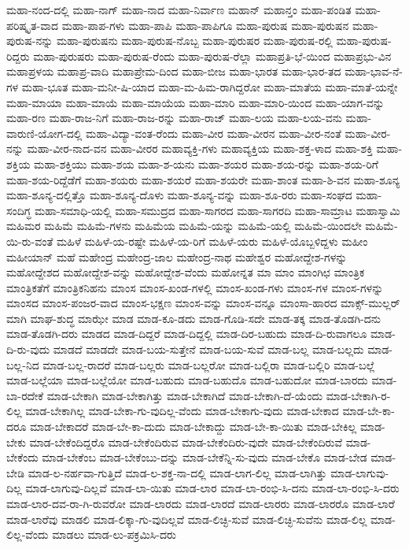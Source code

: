 {ಮಹಾ-ನಂದ-ದಲ್ಲಿ
ಮಹಾ-ನಾಗ್
ಮಹಾ-ನಾದ
ಮಹಾ-ನಿರ್ವಾಣ
ಮಹಾನ್
ಮಹಾನ್ತಂ
ಮಹಾ-ಪಂಡಿತ
ಮಹಾ-ಪರಿಷ್ಕೃತ-ವಾದ
ಮಹಾ-ಪಾಪ-ಗಳು
ಮಹಾ-ಪಾಪಿ
ಮಹಾ-ಪಾಪಿಗೂ
ಮಹಾ-ಪುರುಷ
ಮಹಾ-ಪುರುಷನ
ಮಹಾ-ಪುರುಷ-ನನ್ನು
ಮಹಾ-ಪುರುಷನು
ಮಹಾ-ಪುರುಷ-ನೊಬ್ಬ
ಮಹಾ-ಪುರುಷರ
ಮಹಾ-ಪುರುಷ-ರಲ್ಲಿ
ಮಹಾ-ಪುರುಷ-ರಿದ್ದರು
ಮಹಾ-ಪುರುಷರು
ಮಹಾ-ಪುರುಷ-ರೆಂದು
ಮಹಾ-ಪುರುಷ-ರೆಲ್ಲಾ
ಮಹಾಪ್ರತಿ-ಭೆ-ಯಿಂದ
ಮಹಾಪ್ರಭು-ವಿನ
ಮಹಾಪ್ರಳಯ
ಮಹಾಪ್ರ-ವಾದಿ
ಮಹಾಪ್ರೇಮ-ದಿಂದ
ಮಹಾ-ಬೀಜ
ಮಹಾ-ಭಾರತ
ಮಹಾ-ಭಾರ-ತದ
ಮಹಾ-ಭಾವ-ನೆ-ಗಳ
ಮಹಾ-ಭೂತ
ಮಹಾ-ಮನೀ-ಷಿ-ಯಾದ
ಮಹಾ-ಮ-ಹಿಮ-ರಾಗಿದ್ದರೋ
ಮಹಾ-ಮಾತೆಯ
ಮಹಾ-ಮಾತೆ-ಯನ್ನೇ
ಮಹಾ-ಮಾಯಾ
ಮಹಾ-ಮಾಯೆ
ಮಹಾ-ಮಾಯೆಯ
ಮಹಾ-ಮಾರಿ
ಮಹಾ-ಮಾರಿ-ಯಿಂದ
ಮಹಾ-ಯಾಗ-ವನ್ನು
ಮಹಾ-ರಣ
ಮಹಾ-ರಾಜ-ನಿಗೆ
ಮಹಾ-ರಾಜ-ರನ್ನು
ಮಹಾ-ರಾಜ್
ಮಹಾ-ಲಯ
ಮಹಾ-ಲಯ-ವನು
ಮಹಾ-ವಾರುಣಿ-ಯೋಗ-ದಲ್ಲಿ
ಮಹಾ-ವಿದ್ಯಾ-ವಂತ-ರೆಂದು
ಮಹಾ-ವೀರ
ಮಹಾ-ವೀರನ
ಮಹಾ-ವೀರ-ನಂತೆ
ಮಹಾ-ವೀರ-ನನ್ನು
ಮಹಾ-ವೀರ-ನಾದ-ವನ
ಮಹಾ-ವೀರರ
ಮಹಾವ್ಯಕ್ತಿ-ಗಳು
ಮಹಾವ್ಯಕ್ತಿಯ
ಮಹಾ-ಶಕ್ತ-ಳಾದ
ಮಹಾ-ಶಕ್ತಿ
ಮಹಾ-ಶಕ್ತಿಯ
ಮಹಾ-ಶಕ್ತಿಯು
ಮಹಾ-ಶಯ
ಮಹಾ-ಶ-ಯನು
ಮಹಾ-ಶಯರ
ಮಹಾ-ಶಯ-ರನ್ನು
ಮಹಾ-ಶಯ-ರಿಗೆ
ಮಹಾ-ಶಯ-ರಿದ್ದೆಡೆಗೆ
ಮಹಾ-ಶಯರು
ಮಹಾ-ಶಯರೆ
ಮಹಾ-ಶಯರೇ
ಮಹಾ-ಶಾಂತ
ಮಹಾ-ಶಿ-ವನ
ಮಹಾ-ಶೂನ್ಯ
ಮಹಾ-ಶೂನ್ಯ-ದಲ್ಲಿತ್ತೊ
ಮಹಾ-ಶೂನ್ಯ-ದೊಳು
ಮಹಾ-ಶೂನ್ಯ-ವನ್ನು
ಮಹಾ-ಶೂ-ರರು
ಮಹಾ-ಸಂಘದ
ಮಹಾ-ಸಂದಿಗ್ಧ
ಮಹಾ-ಸಮಾಧಿ-ಯಲ್ಲಿ
ಮಹಾ-ಸಮುದ್ರದ
ಮಹಾ-ಸಾಗರದ
ಮಹಾ-ಸಾಗರದಿ
ಮಹಾ-ಸಾಮ್ರಾಟ
ಮಹಾಸ್ವಾಮಿ
ಮಹಿಮರ
ಮಹಿಮೆ
ಮಹಿಮೆ-ಗಳನು
ಮಹಿಮೆಯ
ಮಹಿಮೆ-ಯನ್ನು
ಮಹಿಮೆ-ಯಲ್ಲಿ
ಮಹಿಮೆ-ಯಿಂದಲೇ
ಮಹಿಮೆ-ಯಿ-ರು-ವಂತೆ
ಮಹಿಳೆ
ಮಹಿಳೆ-ಯ-ರಷ್ಟೇ
ಮಹಿಳೆ-ಯ-ರಿಗೆ
ಮಹಿಳೆ-ಯರು
ಮಹಿಳೆ-ಯೊಬ್ಬಳಿದ್ದಳು
ಮಹೀಂ
ಮಹೀಯಾನ್
ಮಹೆ
ಮಹೇಂದ್ರ
ಮಹೇಂದ್ರ-ಜಾಲ
ಮಹೇಂದ್ರ-ನಾಥ
ಮಹೇಶ್ವರ
ಮಹೋದ್ದೇಶ-ಗಳನ್ನು
ಮಹೋದ್ದೇಶದ
ಮಹೋದ್ದೇಶ-ವನ್ನು
ಮಹೋದ್ದೇಶ-ವೆಂದು
ಮಹೋನ್ನತ
ಮಾ
ಮಾಂ
ಮಾಂಗಿಛ
ಮಾಂತ್ರಿಕ
ಮಾಂತ್ರಿಕತೆಗೆ
ಮಾಂತ್ರಿಕನಿಹನು
ಮಾಂಸ
ಮಾಂಸ-ಖಂಡ-ಗಳಲ್ಲಿ
ಮಾಂಸ-ಖಂಡ-ಗಳು
ಮಾಂಸ-ಗಳ
ಮಾಂಸ-ಗಳನ್ನು
ಮಾಂಸದ
ಮಾಂಸ-ಪಂಜರ-ವಾದ
ಮಾಂಸ-ಭಕ್ಷಣ
ಮಾಂಸ-ವನ್ನು
ಮಾಂಸ-ವನ್ನೂ
ಮಾಂಸಾ-ಹಾರದ
ಮಾಕ್ಸ್-ಮುಲ್ಲರ್
ಮಾಗಿ
ಮಾಘ-ಶುದ್ಧ
ಮಾಝೇ
ಮಾಡ
ಮಾಡ-ಕೂ-ಡದು
ಮಾಡ-ಗೊಡಿ-ಸದೇ
ಮಾಡ-ತಕ್ಕ
ಮಾಡ-ತೊಡಗಿ-ದನು
ಮಾಡ-ತೊಡಗಿ-ದರು
ಮಾಡದ
ಮಾಡ-ದಿದ್ದರೆ
ಮಾಡ-ದಿದ್ದಲ್ಲಿ
ಮಾಡ-ದಿರ-ಬಹುದು
ಮಾಡ-ದಿ-ರುವಾಗಲೂ
ಮಾಡ-ದಿ-ರು-ವುದು
ಮಾಡದೆ
ಮಾಡದೇ
ಮಾಡ-ಬಯ-ಸುತ್ತೇನೆ
ಮಾಡ-ಬಯ-ಸುವೆ
ಮಾಡ-ಬಲ್ಲ
ಮಾಡ-ಬಲ್ಲದು
ಮಾಡ-ಬಲ್ಲ-ನಿದ
ಮಾಡ-ಬಲ್ಲ-ರಾದರೆ
ಮಾಡ-ಬಲ್ಲರು
ಮಾಡ-ಬಲ್ಲರೋ
ಮಾಡ-ಬಲ್ಲಿರಾ
ಮಾಡ-ಬಲ್ಲಿರಿ
ಮಾಡ-ಬಲ್ಲೆ
ಮಾಡ-ಬಲ್ಲೆಯಾ
ಮಾಡ-ಬಲ್ಲೆಯೋ
ಮಾಡ-ಬಹುದು
ಮಾಡ-ಬಹುದೊ
ಮಾಡ-ಬಹುದೋ
ಮಾಡ-ಬಾರದು
ಮಾಡ-ಬಾ-ರದೇಕೆ
ಮಾಡ-ಬೇಕಾಗಿ
ಮಾಡ-ಬೇಕಾಗಿತ್ತು
ಮಾಡ-ಬೇಕಾಗಿದೆ
ಮಾಡ-ಬೇಕಾಗಿ-ದೆ-ಯೆಂದು
ಮಾಡ-ಬೇಕಾಗಿ-ರ-ಲಿಲ್ಲ
ಮಾಡ-ಬೇಕಾಗಿಲ್ಲ
ಮಾಡ-ಬೇಕಾ-ಗು-ವುದಿಲ್ಲ-ವೆಂದು
ಮಾಡ-ಬೇಕಾಗು-ವುದು
ಮಾಡ-ಬೇಕಾದ
ಮಾಡ-ಬೇ-ಕಾ-ದರೂ
ಮಾಡ-ಬೇಕಾದರೆ
ಮಾಡ-ಬೇ-ಕಾ-ದುದು
ಮಾಡ-ಬೇಕಾದ್ದು
ಮಾಡ-ಬೇ-ಕಾ-ಯಿತು
ಮಾಡ-ಬೇಕಿಲ್ಲ
ಮಾಡ-ಬೇಕು
ಮಾಡ-ಬೇಕೆಂದಿದ್ದರೊ
ಮಾಡ-ಬೇಕೆಂದಿರುವ
ಮಾಡ-ಬೇಕೆಂದಿರು-ವುದೇ
ಮಾಡ-ಬೇಕೆಂದಿರುವೆ
ಮಾಡ-ಬೇಕೆಂದು
ಮಾಡ-ಬೇಕೆಂಬ
ಮಾಡ-ಬೇಕೆಂಬು-ದನ್ನು
ಮಾಡ-ಬೇಕೆನ್ನಿ-ಸು-ವುದು
ಮಾಡ-ಬೇಕೊ
ಮಾಡ-ಬೇಡ
ಮಾಡ-ಬೇಡಿ
ಮಾಡ-ಲ-ನರ್ಹವಾ-ಗುತ್ತಿದೆ
ಮಾಡ-ಲ-ಶಕ್ತ-ನಾ-ದಲ್ಲಿ
ಮಾಡ-ಲಾಗ-ಲಿಲ್ಲ
ಮಾಡ-ಲಾಗಿತ್ತು
ಮಾಡ-ಲಾಗುವು-ದಿಲ್ಲ
ಮಾಡ-ಲಾಗುವು-ದಿಲ್ಲವೆ
ಮಾಡ-ಲಾ-ಯಿತು
ಮಾಡ-ಲಾರ
ಮಾಡ-ಲಾ-ರಂಭಿ-ಸಿ-ದನು
ಮಾಡ-ಲಾ-ರಂಭಿ-ಸಿ-ದರು
ಮಾಡ-ಲಾರ-ದವ-ರಾ-ಗಿ-ರುವರೋ
ಮಾಡ-ಲಾರದು
ಮಾಡ-ಲಾರದೆ
ಮಾಡ-ಲಾರರು
ಮಾಡ-ಲಾರರೊ
ಮಾಡ-ಲಾರೆ
ಮಾಡ-ಲಾರೆವು
ಮಾಡಲಿ
ಮಾಡ-ಲಿಕ್ಕಾ-ಗು-ವುದಿಲ್ಲವೆ
ಮಾಡ-ಲಿಚ್ಛಿ-ಸುವೆ
ಮಾಡ-ಲಿಚ್ಛಿ-ಸುವೆನು
ಮಾಡ-ಲಿಲ್ಲ
ಮಾಡ-ಲಿಲ್ಲ-ವೆಂದು
ಮಾಡಲು
ಮಾಡ-ಲು-ಪಕ್ರಮಿಸಿ-ದರು
}
